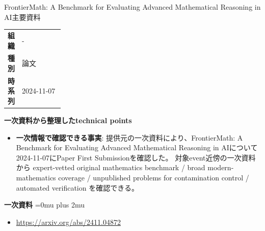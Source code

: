 \begin{technicalnote}{FrontierMath: A Benchmark for Evaluating Advanced Mathematical Reasoning in AI}{主要資料}
\begingroup
\begin{tabularx}{\linewidth}{@{}>{\bfseries}p{0.22\linewidth}X@{}}
組織 & - \\
種別 & 論文 \\
時系列 & 2024-11-07 \\
\end{tabularx}
\smallskip
{\bfseries 一次資料から整理したtechnical points}
\begin{itemize}[leftmargin=1.5em,itemsep=0.35em]
\item \textbf{一次情報で確認できる事実}: 提供元の一次資料により、FrontierMath: A Benchmark for Evaluating Advanced Mathematical Reasoning in AIについて2024-11-07にPaper First Submissionを確認した。 対象event近傍の一次資料から expert-vetted original mathematics benchmark / broad modern-mathematics coverage / unpublished problems for contamination control / automated verification を確認できる。
\end{itemize}
\begin{minipage}{\linewidth}
\begin{samepage}
{\bfseries 一次資料}
\begingroup\sloppy
\Urlmuskip=0mu plus 2mu\relax
\begin{itemize}[leftmargin=1.5em,itemsep=0.25em]
\item {\scriptsize\url{https://arxiv.org/abs/2411.04872}}
\end{itemize}
\endgroup
\end{samepage}
\end{minipage}
\endgroup
\end{technicalnote}
\medskip


